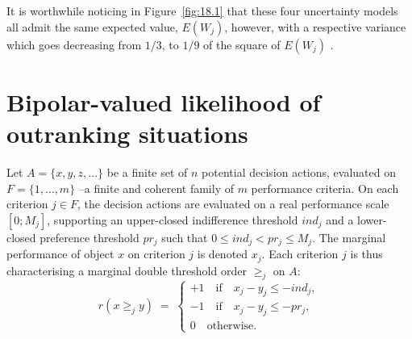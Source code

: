 It is worthwhile noticing in Figure~\vref{fig:18.1} that these four uncertainty models all admit the same expected value, $E(W_j)$, however, with a respective variance which goes decreasing from $1/3$, to $1/9$ of the square of $E(W_j)$ \citep{BIS-2014}.

\section{Bipolar-valued likelihood of outranking situations}
\label{sec:18.2}

Let $A = \{x, y, z,...\}$ be a finite set of $n$ potential decision actions, evaluated on $F = \{1,..., m\}$ --a finite and coherent family of $m$ performance criteria. On each criterion $j \in F$, the decision actions are evaluated on a real performance scale $[0; M_j ]$, supporting an upper-closed indifference threshold $ind_j$ and a lower-closed preference threshold $pr_j$ such that $0 \leq ind_j < pr_j \leq M_j$. The marginal performance of object $x$ on criterion $j$ is denoted $x_j$. Each criterion $j$ is thus characterising a marginal double threshold order $\geq_j$ on $A$:
\begin{equation}
  r(x \geq_j y) \; = \; \begin{cases} +1 \quad \text{if} \quad x_j - y_j \leq -ind_j,\\  -1 \quad \text{if} \quad x_j - y_j \leq -pr_j,\\ 0 \quad \text{otherwise}. \end{cases}
\end{equation}

